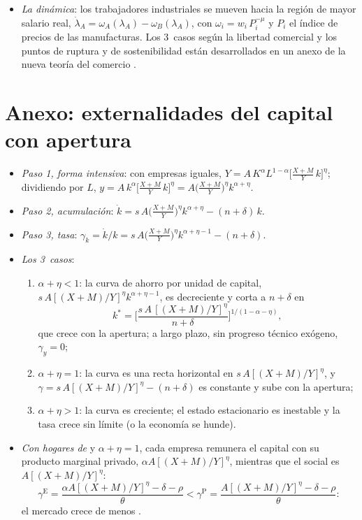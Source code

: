 \documentclass[11pt]{article}
\begin{document}
\begin{itemize}
\begin{enumerate}
  \end{enumerate}
\item \emph{La dinámica}: los trabajadores industriales se mueven hacia la región de mayor salario real, $\dot\lambda_A=\omega_A(\lambda_A)-\omega_B(\lambda_A)$, con $\omega_i=w_i\,P_i^{-\mu}$ y $P_i$ el índice de precios de las manufacturas. Los 3~casos según la libertad comercial y los puntos de ruptura y de sostenibilidad están desarrollados en un anexo de la nueva teoría del comercio .
\end{itemize}

\section{Anexo: externalidades del capital con apertura}\label{anexo:externalidades}

\begin{itemize}
\item \emph{Paso 1, forma intensiva}: con empresas iguales, $Y=A\,K^{\alpha}L^{1-\alpha}\big[\frac{X+M}{Y}\,k\big]^{\eta}$; dividiendo por $L$, $y=A\,k^{\alpha}\big[\frac{X+M}{Y}\,k\big]^{\eta}=A\big(\frac{X+M}{Y}\big)^{\eta}k^{\alpha+\eta}$.
\item \emph{Paso 2, acumulación}: $\dot k=s\,A\big(\frac{X+M}{Y}\big)^{\eta}k^{\alpha+\eta}-(n+\delta)\,k$.
\item \emph{Paso 3, tasa}: $\gamma_k=\dot k/k=s\,A\big(\frac{X+M}{Y}\big)^{\eta}k^{\alpha+\eta-1}-(n+\delta)$.
\item \emph{Los 3~casos}:
  \begin{enumerate}
  \item $\alpha+\eta<1$: la curva de ahorro por unidad de capital, $s\,A[(X+M)/Y]^{\eta}k^{\alpha+\eta-1}$, es decreciente y corta a $n+\delta$ en
    \[
    k^*=\Big[\frac{s\,A\,[(X+M)/Y]^{\eta}}{n+\delta}\Big]^{1/(1-\alpha-\eta)},
    \]
    que crece con la apertura; a largo plazo, sin progreso técnico exógeno, $\gamma_y=0$;
  \item $\alpha+\eta=1$: la curva es una recta horizontal en $s\,A[(X+M)/Y]^{\eta}$, y $\gamma=s\,A[(X+M)/Y]^{\eta}-(n+\delta)$ es constante y sube con la apertura;
  \item $\alpha+\eta>1$: la curva es creciente; el estado estacionario es inestable y la tasa crece sin límite (o la economía se hunde).
  \end{enumerate}
\item \emph{Con hogares de } y $\alpha+\eta=1$, cada empresa remunera el capital con su producto marginal privado, $\alpha A[(X+M)/Y]^{\eta}$, mientras que el social es $A[(X+M)/Y]^{\eta}$:
  \[
  \gamma^{\mathrm E}=\frac{\alpha A[(X+M)/Y]^{\eta}-\delta-\rho}{\theta}<\gamma^{\mathrm P}=\frac{A[(X+M)/Y]^{\eta}-\delta-\rho}{\theta}:
  \]
  el mercado crece de menos .\findemo
\end{itemize}
\end{document}
